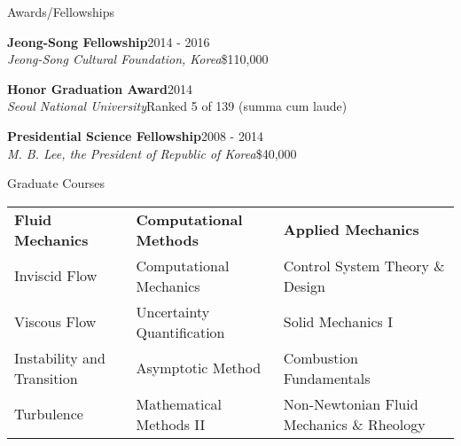\documentclass{resume} %
\begin{document}


\begin{rSection}{Awards/Fellowships}

{\bf Jeong-Song Fellowship}\hfill 2014 - 2016\\
{\it Jeong-Song Cultural Foundation, Korea}\hfill \$110,000

{\bf Honor Graduation Award}\hfill 2014\\
{\it Seoul National University}\hfill Ranked 5 of 139 (summa cum laude)

{\bf Presidential Science Fellowship}\hfill 2008 - 2014\\
{\it M. B. Lee, the President of Republic of Korea}\hfill \$40,000

\end{rSection}

\begin{rSection}{Graduate Courses}
\hspace{-.7cm}
\begin{tabular}{p{4.5cm}p{5cm}l}
\textbf{Fluid Mechanics} & \textbf{Computational Methods} & \textbf{Applied Mechanics}\\
Inviscid Flow & Computational Mechanics & Control System Theory \& Design \\
Viscous Flow & Uncertainty Quantification &  Solid Mechanics I \\
Instability and Transition & Asymptotic Method & Combustion Fundamentals \\
Turbulence & Mathematical Methods II & Non-Newtonian Fluid Mechanics \& Rheology
\end{tabular}

\end{rSection}

%
%
%
%
%
\end{document}

